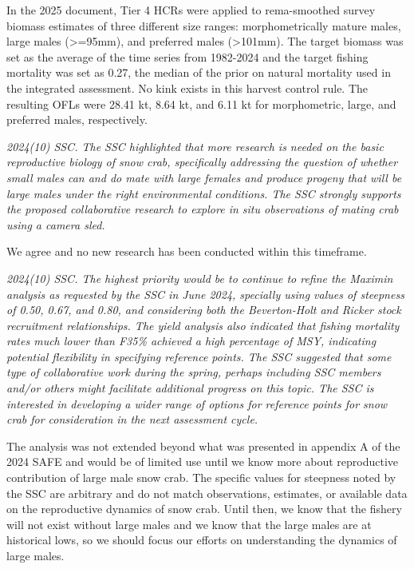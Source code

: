 \documentclass[
]{article}
\begin{document}
In the 2025 document, Tier 4 HCRs were applied to rema-smoothed survey biomass estimates of three different size ranges: morphometrically mature males, large males (\textgreater=95mm), and preferred males (\textgreater101mm). The target biomass was set as the average of the time series from 1982-2024 and the target fishing mortality was set as 0.27, the median of the prior on natural mortality used in the integrated assessment. No kink exists in this harvest control rule. The resulting OFLs were 28.41 kt, 8.64 kt, and 6.11 kt for morphometric, large, and preferred males, respectively.

\emph{2024(10) SSC. The SSC highlighted that more research is needed on the basic reproductive biology of snow crab, specifically addressing the question of whether small males can and do mate with large females and produce progeny that will be large males under the right environmental conditions. The SSC strongly supports the proposed collaborative research to explore in situ observations of mating crab using a camera sled.}

We agree and no new research has been conducted within this timeframe.

\emph{2024(10) SSC. The highest priority would be to continue to refine the Maximin analysis as requested by the SSC in June 2024, specially using values of steepness of 0.50, 0.67, and 0.80, and considering both the Beverton-Holt and Ricker stock recruitment relationships. The yield analysis also indicated that fishing mortality rates much lower than F35\% achieved a high percentage of MSY, indicating potential flexibility in specifying reference points. The SSC suggested that some type of collaborative work during the spring, perhaps including SSC members and/or others might facilitate additional progress on this topic. The SSC is interested in developing a wider range of options for reference points for snow crab for consideration in the next assessment cycle.}

The analysis was not extended beyond what was presented in appendix A of the 2024 SAFE and would be of limited use until we know more about reproductive contribution of large male snow crab. The specific values for steepness noted by the SSC are arbitrary and do not match observations, estimates, or available data on the reproductive dynamics of snow crab. Until then, we know that the fishery will not exist without large males and we know that the large males are at historical lows, so we should focus our efforts on understanding the dynamics of large males.
\end{document}
